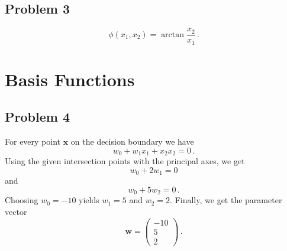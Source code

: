 \documentclass{scrartcl}
\begin{document}
\subsection{Problem 3}
\begin{equation}
	\phi(x_1, x_2) = \arctan \frac{x_2}{x_1} \, .
\end{equation}

\section{Basis Functions}
\subsection{Problem 4}
For every point $\mathbf{x}$ on the decision boundary we have
\begin{equation}
	w_0 + w_1 x_1 + x_2 x_2 = 0 \, .
\end{equation}
Using the given intersection points with the principal axes, we get
\begin{equation}
	w_0 + 2w_1 = 0
\end{equation}
and  
\begin{equation}
	w_0 + 5w_2 = 0 \, .
\end{equation}
Choosing $w_0 = -10$ yields $w_1 = 5$ and $w_2 = 2$.
Finally, we get the parameter vector 
\begin{equation}
	\mathbf{w} = \begin{pmatrix}
		-10\\5\\2
	\end{pmatrix} \, .
\end{equation}
\end{document}
